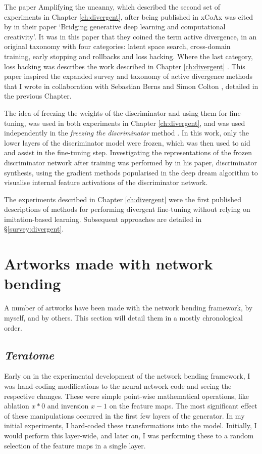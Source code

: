 The paper Amplifying the uncanny, which described the second set of experiments in Chapter \ref{ch:divergent}, after being published in xCoAx was cited by \cite{berns2020bridging} in their paper ‘Bridging generative deep learning and computational creativity’. 
It was in this paper that they coined the term active divergence, in an original taxonomy with four categories: latent space search, cross-domain training, early stopping and rollbacks and loss hacking. 
Where the last category, loss hacking was describes the work described in Chapter \ref{ch:divergent} . 
This paper inspired the expanded survey and taxonomy of active divergence methods that I wrote in collaboration with Sebastian Berns and Simon Colton \citep{broad2021active}, detailed in the previous Chapter.

The idea of freezing the weights of the discriminator and using them for fine-tuning, was used in both experiments in Chapter \ref{ch:divergent}, and was used independently in the \textit{freezing the discriminator} method \citep{mo2020freeze}. In this work, only the lower layers of the discriminator model were frozen, which was then used to aid and assist in the fine-tuning step.
Investigating the representations of the frozen discriminator network after training was performed by \citet{porres2021discriminator} in his paper, discriminator synthesis, using the gradient methods popularised in the deep dream algorithm to visualise internal feature activations of the discriminator network.

The experiments described in Chapter \ref{ch:divergent} were the first published descriptions of methods for performing divergent fine-tuning without relying on imitation-based learning. 
Subsequent approaches are detailed in \S \ref{survey:divergent}.

\section{Artworks made with network bending}
\label{c7:sec:net-bend-artworks}

A number of artworks have been made with the network bending framework, by myself, and by others. 
This section will detail them in a mostly chronological order.

\subsection{\textit{Teratome}}
\label{c7:subsubsec:teratome}

Early on in the experimental development of the network bending framework, I was hand-coding modifications to the neural network code and seeing the respective changes. 
These were simple point-wise mathematical operations, like ablation $x*0$ and inversion $x-1$ on the feature maps. 
The most significant effect of these manipulations occurred in the first few layers of the generator. 
In my initial experiments, I hard-coded these transformations into the model. Initially, I would perform this layer-wide, and later on, I was performing these to a random selection of the feature maps in a single layer. 

